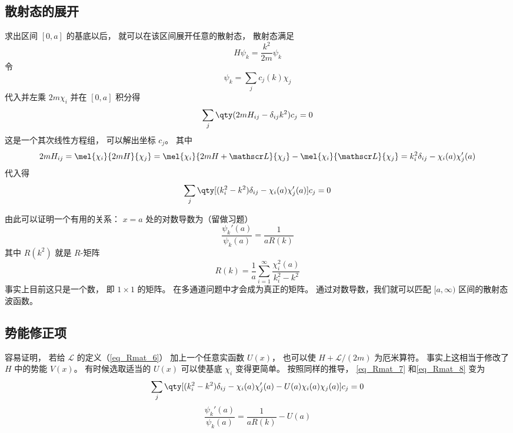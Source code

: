 \subsection{散射态的展开}
求出区间 $[0,a]$ 的基底以后， 就可以在该区间展开任意的散射态， 散射态满足
\begin{equation}\label{eq_Rmat_4}
H\psi_k = \frac{k^2}{2m}\psi_k
\end{equation}
令
\begin{equation}\label{eq_Rmat_5}
\psi_k = \sum_j c_j(k)\chi_j
\end{equation}
代入并左乘 $2m\chi_i$ 并在 $[0,a]$ 积分得
\begin{equation}
\sum_j \qty(2mH_{ij} - \delta_{ij}k^2) c_j = 0
\end{equation}
这是一个其次线性方程组， 可以解出坐标 $c_j$。 其中
\begin{equation}
2mH_{ij} = \mel{\chi_i}{2mH}{\chi_j} = \mel{\chi_i}{2mH + \mathscr L}{\chi_j} - \mel{\chi_i}{\mathscr L}{\chi_j} 
= k_i^2\delta_{ij} - \chi_i(a)\chi'_j(a)
\end{equation}
代入得
\begin{equation}\label{eq_Rmat_7}
\sum_j \qty[(k_i^2 - k^2)\delta_{ij} - \chi_i(a)\chi'_j(a)] c_j = 0
\end{equation}

由此可以证明一个有用的关系： $x=a$ 处的对数导数为（留做习题）
\begin{equation}\label{eq_Rmat_8}
\frac{\psi_k'(a)}{\psi_k(a)} = \frac{1}{aR(k)}
\end{equation}
其中 $R(k^2)$ 就是 $R$-矩阵
\begin{equation}
R(k) = \frac{1}{a} \sum_{i=1}^\infty \frac{\chi_i^2(a)}{k_i^2 - k^2}
\end{equation}
事实上目前这只是一个数， 即 $1\times 1$ 的矩阵。 在多通道问题中才会成为真正的矩阵。 通过对数导数，我们就可以匹配 $[a,\infty)$ 区间的散射态波函数。

\subsection{势能修正项}
容易证明， 若给 $\mathscr L$ 的定义（\autoref{eq_Rmat_6}） 加上一个任意实函数 $U(x)$， 也可以使 $H+\mathscr L/(2m)$ 为厄米算符。 事实上这相当于修改了 $H$ 中的势能 $V(x)$。 有时候选取适当的 $U(x)$ 可以使基底 $\chi_i$ 变得更简单。 按照同样的推导， \autoref{eq_Rmat_7} 和\autoref{eq_Rmat_8} 变为
\begin{equation}
\sum_j \qty[(k_i^2 - k^2)\delta_{ij} - \chi_i(a)\chi'_j(a) - U(a)\chi_i(a)\chi_j(a)] c_j = 0
\end{equation}
\begin{equation}
\frac{\psi_k'(a)}{\psi_k(a)} = \frac{1}{aR(k)} - U(a)
\end{equation}
